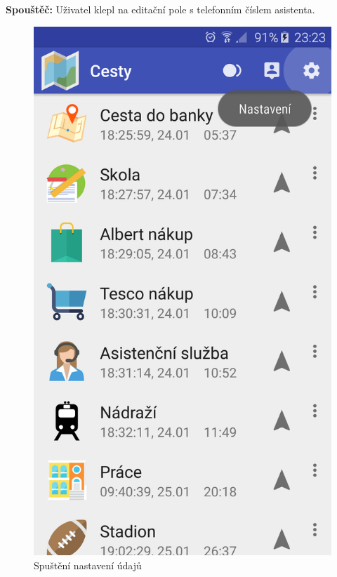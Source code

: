 \documentclass[czech,master,public,dept460,male,java,cpdeclaration]{diploma}
\begin{document}
\vspace{0.1cm}
\noindent
\textbf{Spouštěč:} Uživatel klepl na editační pole s telefonním číslem asistenta.

\begin{figure}[H]
\begin{minipage}{.5\textwidth}
\centering
                \includegraphics[scale=0.14]{img/screen/nastaveni.png}
        \caption{Spuštění nastavení údajů}
        \label{fig:nastaveniudaju}
\end{minipage}

\end{figure}
\end{document}
